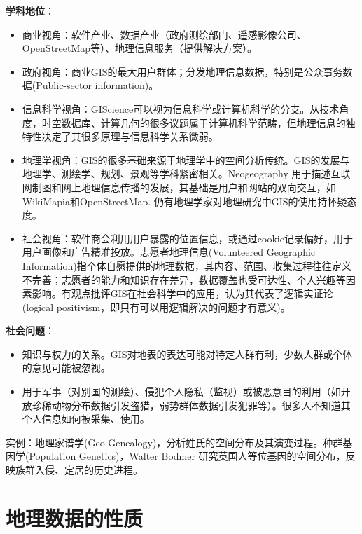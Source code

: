\par \textbf{学科地位}：
\begin{itemize}
    \item 商业视角：软件产业、数据产业（政府测绘部门、遥感影像公司、OpenStreetMap等）、地理信息服务（提供解决方案）。
    \item 政府视角：商业GIS的最大用户群体；分发地理信息数据，特别是公众事务数据(Public-sector information)。
    \item 信息科学视角：GIScience可以视为信息科学或计算机科学的分支。从技术角度，时空数据库、计算几何的很多议题属于计算机科学范畴，但地理信息的独特性决定了其很多原理与信息科学关系微弱。
    \item 地理学视角：GIS的很多基础来源于地理学中的空间分析传统。GIS的发展与地理学、测绘学、规划、景观等学科紧密相关。Neogeography 用于描述互联网制图和网上地理信息传播的发展，其基础是用户和网站的双向交互，如WikiMapia和OpenStreetMap. 仍有地理学家对地理研究中GIS的使用持怀疑态度。
    \item 社会视角：软件商会利用用户暴露的位置信息，或通过cookie记录偏好，用于用户画像和广告精准投放。志愿者地理信息(Volunteered Geographic Information)指个体自愿提供的地理数据，其内容、范围、收集过程往往定义不完善；志愿者的能力和知识存在差异，数据覆盖也受可达性、个人兴趣等因素影响。有观点批评GIS在社会科学中的应用，认为其代表了逻辑实证论(logical positivism，即只有可以用逻辑解决的问题才有意义)。
\end{itemize}

\par \textbf{社会问题}：
\begin{itemize}
    \item 知识与权力的关系。GIS对地表的表达可能对特定人群有利，少数人群或个体的意见可能被忽视。
    \item 用于军事（对别国的测绘）、侵犯个人隐私（监视）或被恶意目的利用（如开放珍稀动物分布数据引发盗猎，弱势群体数据引发犯罪等）。很多人不知道其个人信息如何被采集、使用。
\end{itemize}

\par 实例：地理家谱学(Geo-Genealogy)，分析姓氏的空间分布及其演变过程。种群基因学(Population Genetics)，Walter Bodmer 研究英国人等位基因的空间分布，反映族群入侵、定居的历史进程。

\section{地理数据的性质}

